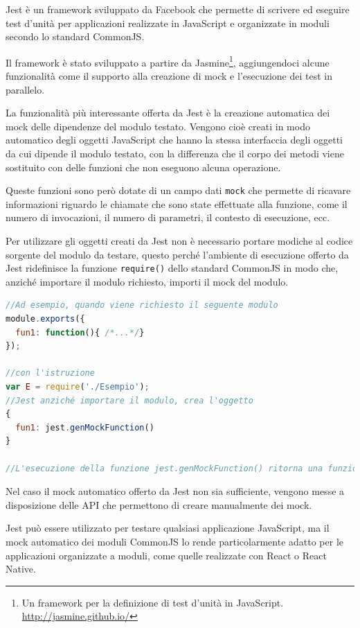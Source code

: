 Jest è un framework sviluppato da Facebook che permette di scrivere ed eseguire test d'unità per applicazioni realizzate in JavaScript e organizzate in moduli secondo lo standard CommonJS.

Il framework è stato sviluppato a partire da Jasmine\footnote{Un framework per la definizione di test d'unità in JavaScript. \url{http://jasmine.github.io/}}, aggiungendoci alcune funzionalità come il supporto alla creazione di \gls{mock} e l'esecuzione dei test in parallelo.

La funzionalità più interessante offerta da Jest è la creazione automatica dei mock delle dipendenze del modulo testato. Vengono cioè creati in modo automatico degli oggetti JavaScript che hanno la stessa interfaccia degli oggetti da cui dipende il modulo testato, con la differenza che il corpo dei metodi viene sostituito con delle funzioni che non eseguono alcuna operazione.

Queste funzioni sono però dotate di un campo dati \texttt{mock} che permette di ricavare informazioni riguardo le chiamate che sono state effettuate alla funzione, come il numero di invocazioni, il numero di parametri, il contesto di esecuzione, ecc.

Per utilizzare gli oggetti creati da Jest non è necessario portare modiche al codice sorgente del modulo da testare, questo perché l'ambiente di esecuzione offerto da Jest ridefinisce la funzione \texttt{require()} dello standard CommonJS in modo che, anziché importare il modulo richiesto, importi il mock del modulo.

\begin{lstlisting}[language=JavaScript, caption=Esempio di mock creato da Jest]
//Ad esempio, quando viene richiesto il seguente modulo
module.exports({
  fun1: function(){ /*...*/}
});

//con l'istruzione
var E = require('./Esempio');
//Jest anziché importare il modulo, crea l'oggetto
{
  fun1: jest.genMockFunction()
}

//L'esecuzione della funzione jest.genMockFunction() ritorna una funzione con il corpo vuoto e con un campo dati .mock che, durante l'esecuzione del test, andrà a contenere le informazioni riguardo le varie invocazioni della funzione.
\end{lstlisting}

Nel caso il mock automatico offerto da Jest non sia sufficiente, vengono messe a disposizione delle API che permettono di creare manualmente dei mock.

Jest può essere utilizzato per testare qualsiasi applicazione JavaScript, ma il mock automatico dei moduli CommonJS lo rende particolarmente adatto per le applicazioni organizzate a moduli, come quelle realizzate con React o React Native.